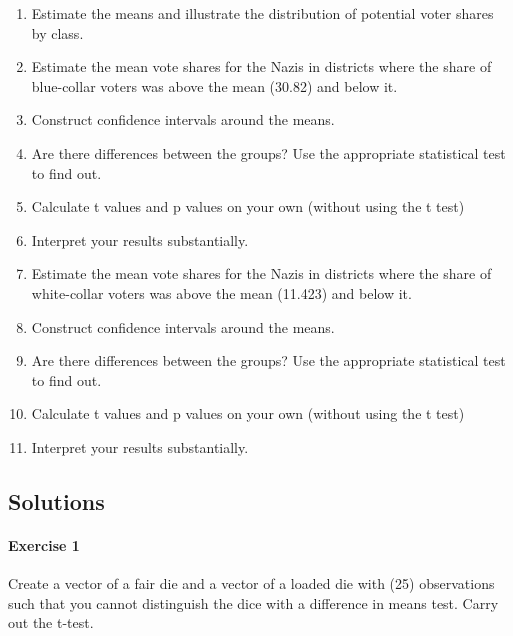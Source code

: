 \documentclass[]{article}
\providecommand{\tightlist}{%
  \setlength{\itemsep}{0pt}\setlength{\parskip}{0pt}}
\let\oldparagraph\paragraph
\renewcommand{\paragraph}[1]{\oldparagraph{#1}\mbox{}}
\theoremstyle{definition}
\theoremstyle{definition}
\theoremstyle{definition}
\theoremstyle{remark}
\begin{document}
\begin{enumerate}
\def\labelenumi{\arabic{enumi}.}
\setcounter{enumi}{3}
\tightlist
\item
  Estimate the means and illustrate the distribution of potential voter
  shares by class.
\item
  Estimate the mean vote shares for the Nazis in districts where the
  share of blue-collar voters was above the mean (30.82) and below it.
\item
  Construct confidence intervals around the means.
\item
  Are there differences between the groups? Use the appropriate
  statistical test to find out.
\item
  Calculate t values and p values on your own (without using the t test)
\item
  Interpret your results substantially.
\item
  Estimate the mean vote shares for the Nazis in districts where the
  share of white-collar voters was above the mean (11.423) and below it.
\item
  Construct confidence intervals around the means.
\item
  Are there differences between the groups? Use the appropriate
  statistical test to find out.
\item
  Calculate t values and p values on your own (without using the t test)
\item
  Interpret your results substantially.
\end{enumerate}

\subsection{Solutions}\label{solutions-4}

\paragraph{Exercise 1}\label{exercise-1}

Create a vector of a fair die and a vector of a loaded die with (25)
observations such that you cannot distinguish the dice with a difference
in means test. Carry out the t-test.
\end{document}
